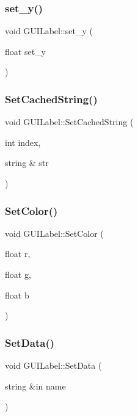 \subsubsection{\texorpdfstring{set\+\_\+y()}{set\_y()}}
{\footnotesize\ttfamily void G\+U\+I\+Label\+::set\+\_\+y (\begin{DoxyParamCaption}\item[{float}]{set\+\_\+y }\end{DoxyParamCaption})}

\hypertarget{class_g_u_i_label_a7bea55c4ba7501ef53fcbb31c0e5bab7}{}\label{class_g_u_i_label_a7bea55c4ba7501ef53fcbb31c0e5bab7} 
\subsubsection{\texorpdfstring{Set\+Cached\+String()}{SetCachedString()}}
{\footnotesize\ttfamily void G\+U\+I\+Label\+::\+Set\+Cached\+String (\begin{DoxyParamCaption}\item[{int}]{index,  }\item[{string \&}]{str }\end{DoxyParamCaption})}

\hypertarget{class_g_u_i_label_a244891e5099f5372bfe39efae20d6593}{}\label{class_g_u_i_label_a244891e5099f5372bfe39efae20d6593} 
\subsubsection{\texorpdfstring{Set\+Color()}{SetColor()}}
{\footnotesize\ttfamily void G\+U\+I\+Label\+::\+Set\+Color (\begin{DoxyParamCaption}\item[{float}]{r,  }\item[{float}]{g,  }\item[{float}]{b }\end{DoxyParamCaption})}

\hypertarget{class_g_u_i_label_a91c5449f9dbc88eed31fdf21c002b6c4}{}\label{class_g_u_i_label_a91c5449f9dbc88eed31fdf21c002b6c4} 
\subsubsection{\texorpdfstring{Set\+Data()}{SetData()}}
{\footnotesize\ttfamily void G\+U\+I\+Label\+::\+Set\+Data (\begin{DoxyParamCaption}\item[{string \&in}]{name }\end{DoxyParamCaption})}


